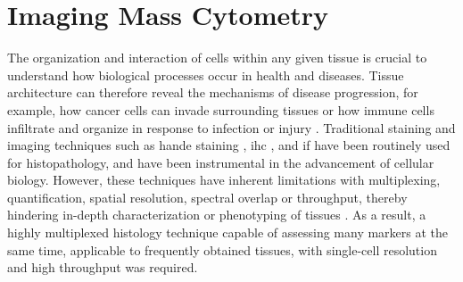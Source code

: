 


\section{Imaging Mass Cytometry}  %
\label{sec:int_IMC}


The organization and interaction of cells within any given tissue is crucial to understand how biological processes occur in health and diseases. Tissue architecture can therefore reveal the mechanisms of disease progression, for example, how cancer cells can invade surrounding tissues or how immune cells infiltrate and organize in response to infection or injury \textbf{\cite{veenstra_research_2021}}. Traditional staining and imaging techniques such as \gls{hande} staining \textbf{\cite{titford_progress_2009}}, \gls{ihc} \textbf{\cite{ortiz_hidalgo_immunohistochemistry_2022}}, and \gls{if} %
\textbf{\cite{odell_immunofluorescence_2013}} have been routinely used for histopathology, and have been instrumental in the advancement of cellular biology. However, these techniques have inherent limitations with multiplexing, quantification, spatial resolution, spectral overlap or throughput, thereby hindering in-depth characterization or phenotyping of tissues \textbf{\cite{veenstra_research_2021,leroux_imaging_2021}}. As a result, a highly multiplexed histology technique capable of assessing many markers at the same time, applicable to frequently obtained tissues, with single-cell resolution and high throughput was required.\\

